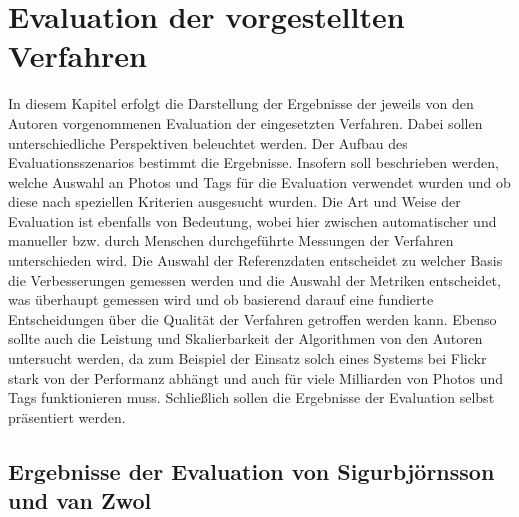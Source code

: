 \section{Evaluation der vorgestellten Verfahren} %
\label{sec:evaluation_der_verfahren}

In diesem Kapitel erfolgt die Darstellung der Ergebnisse der jeweils von den Autoren vorgenommenen Evaluation der eingesetzten Verfahren. Dabei sollen unterschiedliche Perspektiven beleuchtet werden. Der Aufbau des Evaluationsszenarios bestimmt die Ergebnisse. Insofern soll beschrieben werden, welche Auswahl an Photos und Tags für die Evaluation verwendet wurden und ob diese nach speziellen Kriterien ausgesucht wurden. Die Art und Weise der Evaluation ist ebenfalls von Bedeutung, wobei hier zwischen automatischer und manueller bzw. durch Menschen durchgeführte Messungen der Verfahren unterschieden wird. Die Auswahl der Referenzdaten entscheidet zu welcher Basis die Verbesserungen gemessen werden und die Auswahl der Metriken entscheidet, was überhaupt gemessen wird und ob basierend darauf eine fundierte Entscheidungen über die Qualität der Verfahren getroffen werden kann. Ebenso sollte auch die Leistung und Skalierbarkeit der Algorithmen von den Autoren untersucht werden, da zum Beispiel der Einsatz solch eines Systems bei Flickr stark von der Performanz abhängt und auch für viele Milliarden von Photos und Tags funktionieren muss. Schließlich sollen die Ergebnisse der Evaluation selbst präsentiert werden.


\subsection{Ergebnisse der Evaluation von Sigurbjörnsson und van Zwol} %
\label{sub:ergebnisse_der_evaluation_von_collectiveknowledge}

